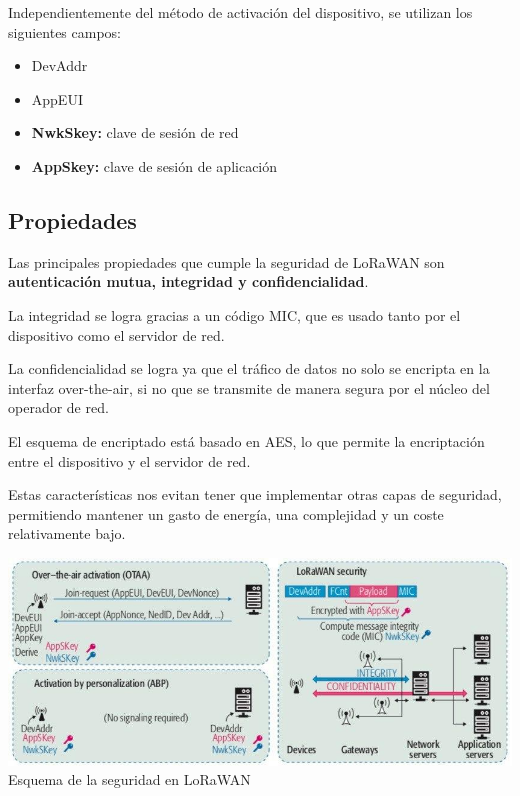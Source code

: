\documentclass[11pt,a4paper]{article}
\begin{document}
\bigskip

Independientemente del método de activación del dispositivo, se utilizan los siguientes campos:

\begin{itemize}
\item DevAddr
\item AppEUI
\item \textbf{NwkSkey:} clave de sesión de red
\item \textbf{AppSkey:} clave de sesión de aplicación
\end{itemize}

\medskip

\subsection*{Propiedades}
Las principales propiedades que cumple la seguridad de LoRaWAN son \textbf{autenticación mutua, integridad y confidencialidad}. 

\medskip

La integridad se logra gracias a un código MIC, que es usado tanto por el dispositivo como el servidor de red.

\medskip

La confidencialidad se logra ya que el tráfico de datos no solo se encripta en la interfaz over-the-air, si no que se transmite de manera segura por el núcleo del operador de red.

\medskip

El esquema de encriptado está basado en AES, lo que permite la encriptación entre el dispositivo y el servidor de red. 

\medskip

Estas características nos evitan tener que implementar otras capas de seguridad, permitiendo mantener un gasto de energía, una complejidad y un coste relativamente bajo.

\begin{center}
\includegraphics[scale=0.7]{img/sec.jpg} \\
\small{Esquema de la seguridad en LoRaWAN}
\end{center}
\end{document}
